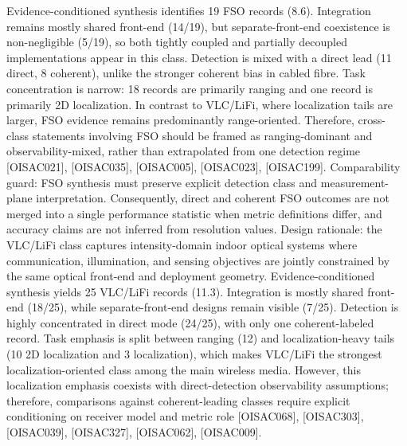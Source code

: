 {}Evidence-conditioned synthesis identifies 19 FSO records (8.6\markdownRendererPercentSign{}). Integration remains mostly shared front-end (14/19), but separate-front-end coexistence is non-negligible (5/19), so both tightly coupled and partially decoupled implementations appear in this class. Detection is mixed with a direct lead (11 direct, 8 coherent), unlike the stronger coherent bias in cabled fibre. Task concentration is narrow: 18 records are primarily ranging and one record is primarily 2D localization. In contrast to VLC/LiFi, where localization tails are larger, FSO evidence remains predominantly range-oriented. Therefore, cross-class statements involving FSO should be framed as ranging-dominant and observability-mixed, rather than extrapolated from one detection regime [O\markdownRendererUnderscore{}ISAC\markdownRendererUnderscore{}021], [O\markdownRendererUnderscore{}ISAC\markdownRendererUnderscore{}035], [O\markdownRendererUnderscore{}ISAC\markdownRendererUnderscore{}005], [O\markdownRendererUnderscore{}ISAC\markdownRendererUnderscore{}023], [O\markdownRendererUnderscore{}ISAC\markdownRendererUnderscore{}199].\markdownRendererParagraphSeparator
{}Comparability guard: FSO synthesis must preserve explicit detection class and measurement-plane interpretation. Consequently, direct and coherent FSO outcomes are not merged into a single performance statistic when metric definitions differ, and accuracy claims are not inferred from resolution values.\markdownRendererInterblockSeparator
{}
\markdownRendererSectionEnd \markdownRendererSectionBegin
{}\markdownRendererInterblockSeparator
{}Design rationale: the VLC/LiFi class captures intensity-domain indoor optical systems where communication, illumination, and sensing objectives are jointly constrained by the same optical front-end and deployment geometry.\markdownRendererParagraphSeparator
{}Evidence-conditioned synthesis yields 25 VLC/LiFi records (11.3\markdownRendererPercentSign{}). Integration is mostly shared front-end (18/25), while separate-front-end designs remain visible (7/25). Detection is highly concentrated in direct mode (24/25), with only one coherent-labeled record. Task emphasis is split between ranging (12) and localization-heavy tails (10 2D localization and 3 localization), which makes VLC/LiFi the strongest localization-oriented class among the main wireless media. However, this localization emphasis coexists with direct-detection observability assumptions; therefore, comparisons against coherent-leading classes require explicit conditioning on receiver model and metric role [O\markdownRendererUnderscore{}ISAC\markdownRendererUnderscore{}068], [O\markdownRendererUnderscore{}ISAC\markdownRendererUnderscore{}303], [O\markdownRendererUnderscore{}ISAC\markdownRendererUnderscore{}039], [O\markdownRendererUnderscore{}ISAC\markdownRendererUnderscore{}327], [O\markdownRendererUnderscore{}ISAC\markdownRendererUnderscore{}062], [O\markdownRendererUnderscore{}ISAC\markdownRendererUnderscore{}009].\markdownRendererParagraphSeparator
